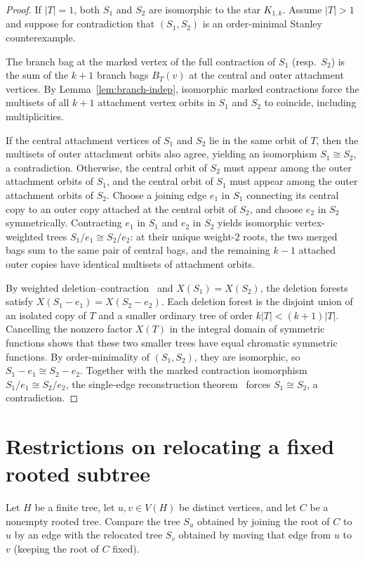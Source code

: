 \documentclass[10pt]{article}
\begin{document}
\begin{proof}
If $|T|=1$, both $S_1$ and $S_2$ are isomorphic to the star $K_{1,k}$. Assume $|T|>1$ and suppose for contradiction that $(S_1,S_2)$ is an order-minimal Stanley counterexample.

The branch bag at the marked vertex of the full contraction of $S_1$ (resp.\ $S_2$) is the sum of the $k+1$ branch bags $B_T(v)$ at the central and outer attachment vertices. By Lemma~\ref{lem:branch-indep}, isomorphic marked contractions force the multisets of all $k+1$ attachment vertex orbits in $S_1$ and $S_2$ to coincide, including multiplicities.

If the central attachment vertices of $S_1$ and $S_2$ lie in the same orbit of $T$, then the multisets of outer attachment orbits also agree, yielding an isomorphism $S_1\cong S_2$, a contradiction. Otherwise, the central orbit of $S_2$ must appear among the outer attachment orbits of $S_1$, and the central orbit of $S_1$ must appear among the outer attachment orbits of $S_2$. Choose a joining edge $e_1$ in $S_1$ connecting its central copy to an outer copy attached at the central orbit of $S_2$, and choose $e_2$ in $S_2$ symmetrically. Contracting $e_1$ in $S_1$ and $e_2$ in $S_2$ yields isomorphic vertex-weighted trees $S_1/e_1\cong S_2/e_2$: at their unique weight-$2$ roots, the two merged bags sum to the same pair of central bags, and the remaining $k-1$ attached outer copies have identical multisets of attachment orbits.

By weighted deletion--contraction~\cite{crew-spirkl} and $X(S_1)=X(S_2)$, the deletion forests satisfy $X(S_1-e_1)=X(S_2-e_2)$. Each deletion forest is the disjoint union of an isolated copy of $T$ and a smaller ordinary tree of order $k|T|<(k+1)|T|$. Cancelling the nonzero factor $X(T)$ in the integral domain of symmetric functions shows that these two smaller trees have equal chromatic symmetric functions. By order-minimality of $(S_1,S_2)$, they are isomorphic, so $S_1-e_1\cong S_2-e_2$. Together with the marked contraction isomorphism $S_1/e_1\cong S_2/e_2$, the single-edge reconstruction theorem~\cite{single-edge} forces $S_1\cong S_2$, a contradiction.
\end{proof}

\section{Restrictions on relocating a fixed rooted subtree}

Let $H$ be a finite tree, let $u,v\in V(H)$ be distinct vertices, and let $C$ be a nonempty rooted tree. Compare the tree $S_u$ obtained by joining the root of $C$ to $u$ by an edge with the relocated tree $S_v$ obtained by moving that edge from $u$ to $v$ (keeping the root of $C$ fixed).
\end{document}
